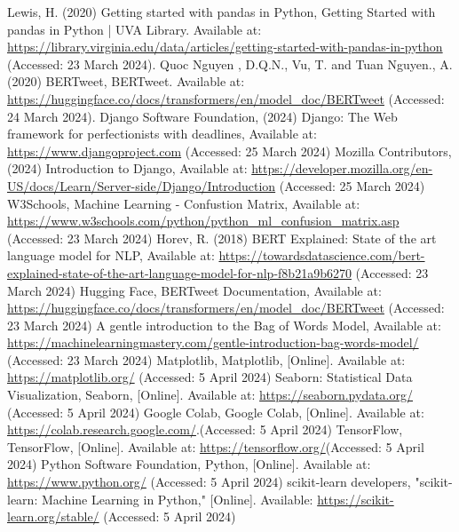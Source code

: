 \documentclass[conference]{IEEEtran}
\begin{document}
\begin{thebibliography}{00}
 Lewis, H. (2020) Getting started with pandas in Python, Getting Started with pandas in Python | UVA Library. Available at: \url{https://library.virginia.edu/data/articles/getting-started-with-pandas-in-python} (Accessed: 23 March 2024). 
 Quoc Nguyen , D.Q.N.,  Vu, T. and Tuan Nguyen., A. (2020) BERTweet, BERTweet. Available at: \url{https://huggingface.co/docs/transformers/en/model_doc/BERTweet} (Accessed: 24 March 2024). 
 Django Software Foundation, (2024) Django: The Web framework for perfectionists with deadlines, Available at: \url{https://www.djangoproject.com} (Accessed: 25 March 2024)
 Mozilla Contributors, (2024) Introduction to Django, Available at: \url{https://developer.mozilla.org/en-US/docs/Learn/Server-side/Django/Introduction} (Accessed: 25 March 2024)
 W3Schools, Machine Learning - Confustion Matrix, Available at: \url{https://www.w3schools.com/python/python_ml_confusion_matrix.asp} (Accessed: 23 March 2024)
 Horev, R. (2018) BERT Explained: State of the art language model for NLP, Available at: \url{https://towardsdatascience.com/bert-explained-state-of-the-art-language-model-for-nlp-f8b21a9b6270} (Accessed: 23 March 2024)
 Hugging Face, BERTweet Documentation, Available at: \url{https://huggingface.co/docs/transformers/en/model_doc/BERTweet} (Accessed: 23 March 2024)
 A gentle introduction to the Bag of Words Model, Available at: \url{https://machinelearningmastery.com/gentle-introduction-bag-words-model/} (Accessed: 23 March 2024)
 Matplotlib, Matplotlib, [Online]. Available at: \url{https://matplotlib.org/} (Accessed: 5 April 2024)
 Seaborn: Statistical Data Visualization, Seaborn, [Online]. Available at: \url{https://seaborn.pydata.org/} (Accessed: 5 April 2024)
 Google Colab, Google Colab, [Online]. Available at: \url{https://colab.research.google.com/}.(Accessed: 5 April 2024)
 TensorFlow, TensorFlow, [Online]. Available at: \url{https://tensorflow.org/}(Accessed: 5 April 2024)
 Python Software Foundation, Python, [Online]. Available at: \url{https://www.python.org/} (Accessed: 5 April 2024)
 scikit-learn developers, "scikit-learn: Machine Learning in Python," [Online]. Available: \url{https://scikit-learn.org/stable/} (Accessed: 5 April 2024)
\end{thebibliography}
\vspace{12pt}
\end{document}
